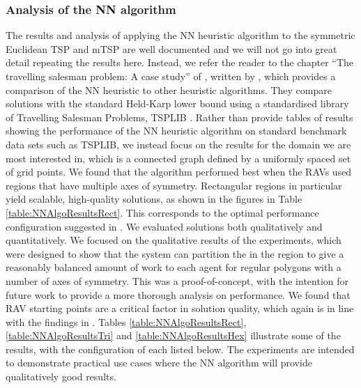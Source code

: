 


\subsubsection{Analysis of the NN algorithm}


The results and analysis of applying the NN heuristic algorithm to the symmetric Euclidean TSP and mTSP are well documented and we will not go into great detail repeating the results here. Instead, we refer the reader to the chapter ``The travelling salesman problem: A case study'' of \cite{Aarts:1997:LSC:549160}, written by \citeauthor{Johnson1995TheOptimization}, which provides a comparison of the NN heuristic to other heuristic algorithms. They compare solutions with the standard Held-Karp lower bound \cite{Held1962AProblems} using a standardised library of Travelling Salesman Problems, TSPLIB \cite{TSPLIB}. Rather than provide tables of results showing the performance of the NN heuristic algorithm on standard benchmark data sets such as TSPLIB, we instead focus on the results for the domain we are most interested in, which is a connected graph defined by a uniformly spaced set of grid points. We found that the algorithm performed best when the RAVs used regions that have multiple axes of symmetry. Rectangular regions in particular yield scalable, high-quality solutions, as shown in the figures in Table \ref{table:NNAlgoResultsRect}. This corresponds to the optimal performance configuration suggested in \cite{Hungerlander2018TheGrids}. We evaluated solutions both qualitatively and  quantitatively. We focused on the qualitative results of the experiments, which were designed to show that the system can partition the in the region to give a reasonably balanced amount of work to each agent for regular polygons with a number of axes of symmetry. This was a proof-of-concept, with the intention for future work to provide a more thorough analysis on performance. We found that RAV starting points are a critical factor in solution quality, which again is in line with the findings in \cite{Hungerlander2018TheGrids}. Tables \ref{table:NNAlgoResultsRect}, \ref{table:NNAlgoResultsTri} and \ref{table:NNAlgoResultsHex} %
illustrate some of the results, with the configuration of each listed below. The experiments are intended to demonstrate practical use cases where the NN algorithm will provide qualitatively good results.

